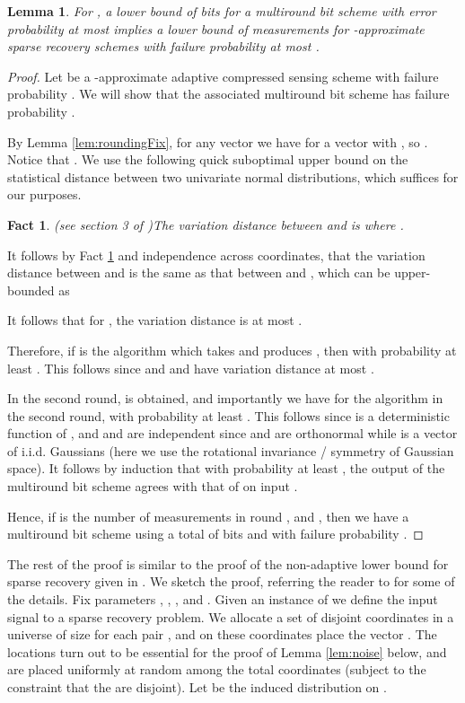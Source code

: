 \documentclass[twoside,leqno,twocolumn]{article}
\newtheorem{lemma}[theorem]{Lemma}
\newtheorem{fact}[theorem]{Fact}
\begin{document}
\begin{lemma}\label{lem:bits}
  For , a lower bound of  bits for a multiround bit scheme 
  with error probability at most  implies a lower bound of
   measurements for 
  -approximate sparse recovery schemes with failure probability
  at most .
\end{lemma}
\begin{proof}
  Let  be a -approximate adaptive compressed
  sensing scheme with failure probability . We will show that
  the associated multiround bit scheme has failure probability .


By Lemma \ref{lem:roundingFix}, for any vector  
we have  for a vector  with
  , so . 
Notice that .
We use the following quick suboptimal upper bound on the 
statistical distance between two univariate normal
distributions, which suffices for our purposes. 
\begin{fact}(see section 3 of \cite{p05})\label{fact:gaussian}
The variation distance between  and  is 
where . 
\end{fact}
It follows by Fact \ref{fact:gaussian} and independence across coordinates, that the variation
distance between  and 
 is the same as that between
 and , which can be upper-bounded
as

It follows that for , the variation distance is at most . 

Therefore, if  is the algorithm which
  takes  and produces , then 
   with probability
  at least . This follows since 
  and  and  have variation distance at most . 

In the second round,  is obtained,
  and importantly we have for the algorithm  in the second round,
   with probability
  at least . This follows
  since  is a deterministic function of , and  and  are independent
  since  and  are orthonormal while  is a vector of i.i.d. Gaussians (here we
  use the rotational invariance / symmetry of Gaussian space). 
  It follows by induction that with probability at least , the output
  of the multiround bit scheme agrees with that of  on input .

  Hence, if  is the number of measurements in round , and , then we have a multiround bit scheme using a
  total of  bits and with failure
  probability .
\end{proof}
The rest of the proof is similar to the proof of the non-adaptive lower bound for 
sparse recovery given in \cite{PW11}. We sketch the proof, referring the reader to \cite{PW11}
for some of the details.
Fix parameters , , , and . Given an instance  of  we define the input signal
 to a sparse recovery problem. We allocate a set  of 
disjoint coordinates in a universe of size  for each pair , and on these coordinates place the vector .  The
locations turn out to be essential for the proof of Lemma \ref{lem:noise} below, 
and are placed uniformly at random among the  total coordinates (subject to the
constraint that the  are disjoint). 
Let  be the induced distribution on .
\end{document}
